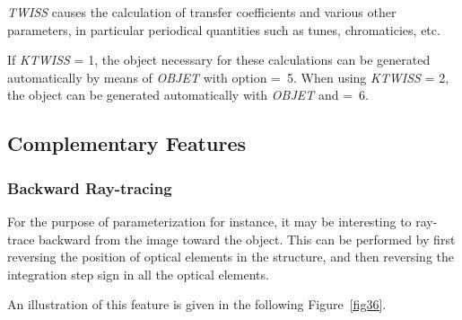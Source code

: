 \textsl{TWISS}  
causes the calculation of 
  transfer coefficients and various other parameters, in particular 
periodical quantities  such as tunes, chromaticies, etc. 

\noindent If \textsl{KTWISS} = 1, the object necessary for these calculations 
    can be generated automatically by means of \textsl{OBJET}  with
option \mbox{\KOBJ= 5}.   
When using 
\textsl{KTWISS} = 2, the object can be generated automatically with \textsl{OBJET}  and 
 \mbox{\KOBJ=  6}. 

 
\newpage




\subsection{Complementary Features} \label{sec4.6}  

\subsubsection{Backward Ray-tracing} \label{sec4.6.3} 
 

For the purpose of parameterization for instance, it may be interesting to ray-trace 
backward  from the image toward the object.  This can be performed by first 
reversing the position of optical elements in the structure, and then 
reversing the integration step sign in all the optical elements.  
\bigskip

\noindent An illustration of this feature is given in the following
Figure~\ref{fig36}.    


